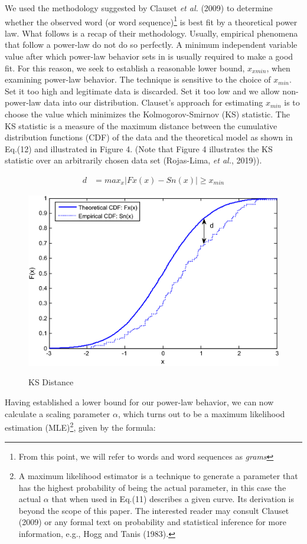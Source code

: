 \documentclass[12pt]{article}
\begin{document}
We used the methodology suggested by Clauset \emph{et al.} (2009) to determine whether the observed word (or word sequence)\footnote[7]{From this point, we will refer to words and word sequences as \emph{grams}} is best fit by a theoretical power law. What follows is a recap of their methodology. Usually, empirical phenomena that follow a power-law do not do so perfectly. A minimum independent variable value after which power-law behavior sets in is usually required to make a good fit. For this reason, we seek to establish a reasonable lower bound, $x_{xmin}$, when examining power-law behavior.  The technique is sensitive to the choice of $x_{min}$.  Set it too high and legitimate data is discarded.  Set it too low and we allow non-power-law data into our distribution. Clauset's approach for estimating $x_{min}$ is to choose the value which minimizes the Kolmogorov-Smirnov (KS) statistic. The KS statistic is a measure of the maximum distance between the cumulative distribution functions (CDF) of the data and the theoretical model as shown in Eq.(12) and illustrated in Figure 4. (Note that Figure 4 illustrates the KS statistic over an arbitrarily chosen data set (Rojas-Lima, \emph{et al.}, 2019)).

\begin{align}
d &= max_x|Fx(x)-Sn(x)|\geq x_{min}
\end{align}


\begin{figure}[h!]
\centering
  \includegraphics[scale=.75]{ks_test.png}\\
  \caption{KS Distance}
\end{figure}

Having established a lower bound for our power-law behavior, we can now calculate a scaling parameter $\alpha$, which turns out to be a  maximum likelihood estimation (MLE)\footnote[8]{A maximum likelihood estimator is a technique to generate a parameter that has the highest probability of being the actual parameter, in this case the actual $\alpha$ that when used in Eq.(11) describes a given curve.  Its derivation is beyond the scope of this paper.  The interested reader may consult Clauset (2009) or any formal text on probability and statistical inference for more information, e.g., Hogg and Tanis (1983).}, given by the formula:
\end{document}
